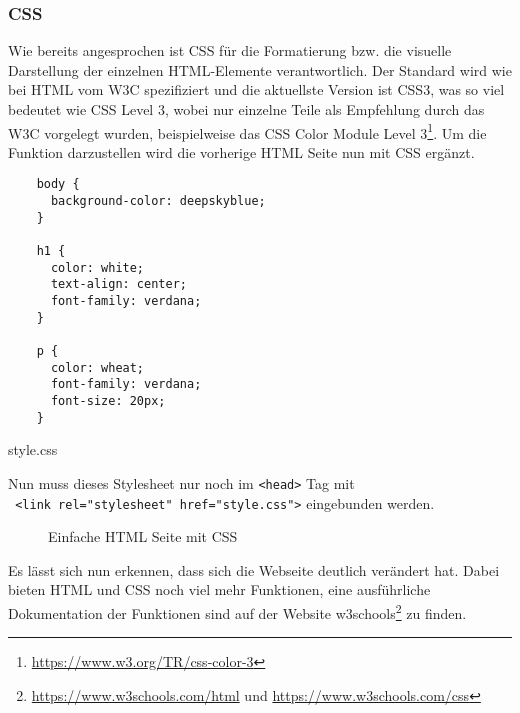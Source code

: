 \subsubsection{CSS}
Wie bereits angesprochen ist \ac*{CSS} für die Formatierung bzw. die visuelle
Darstellung der einzelnen HTML-Elemente verantwortlich. Der Standard wird wie
bei HTML vom \acs*{W3C} spezifiziert und die aktuellste Version ist CSS3, was so
viel bedeutet wie \acs*{CSS} Level 3, wobei nur einzelne Teile als Empfehlung
durch das \acs*{W3C} vorgelegt wurden, beispielweise das CSS Color Module Level
3\footnote{\url{https://www.w3.org/TR/css-color-3}}. Um die Funktion
darzustellen wird die vorherige HTML Seite nun mit CSS ergänzt.

\begin{listing}[H]
  \begin{verbatim}
    body {
      background-color: deepskyblue;
    }

    h1 {
      color: white;
      text-align: center;
      font-family: verdana;
    }

    p {
      color: wheat;
      font-family: verdana;
      font-size: 20px;
    }
  \end{verbatim}
  \caption{style.css}
\end{listing}

Nun muss dieses Stylesheet nur noch im \verb|<head>| Tag mit\\
\texttt{  <link rel="stylesheet" href="style.css">} eingebunden werden.

\begin{figure}[H]
  \centering
  \caption{Einfache HTML Seite mit CSS}
\end{figure}

Es lässt sich nun erkennen, dass sich die Webseite deutlich verändert hat. Dabei
bieten HTML und CSS noch viel mehr Funktionen, eine ausführliche
Dokumentation der Funktionen sind auf der Website
w3schools\footnote{\url{https://www.w3schools.com/html} und
\url{https://www.w3schools.com/css}} zu finden.

